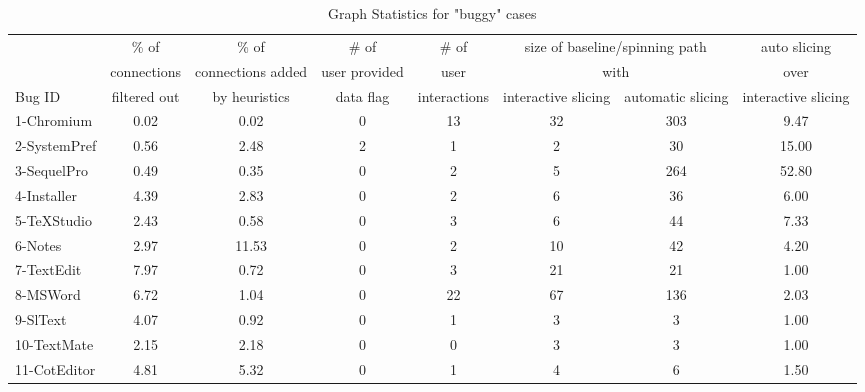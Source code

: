 \begin{table*}[ht]
\footnotesize
\centering
  \begin{tabularx}{\textwidth}{l|ccccccc}
 	   & \% of & \% of & \# of& \# of & \multicolumn{2}{c}{size of baseline/spinning path}& auto slicing\\
       & connections & connections added  & user provided & user  & \multicolumn{2}{c}{with}  & over \\
Bug ID & filtered out & by heuristics & data flag & interactions & interactive slicing & automatic slicing &  interactive slicing\\
\hline
\hline
1-Chromium & 0.02 & 0.02 & 0 & 13 & 32 & 303 & 9.47\\
2-SystemPref & 0.56 & 2.48 & 2 & 1 & 2 & 30 & 15.00\\
3-SequelPro & 0.49 & 0.35 & 0 & 2 & 5 & 264 & 52.80\\
4-Installer & 4.39 & 2.83 & 0 & 2 & 6 & 36  & 6.00\\
5-TeXStudio & 2.43 & 0.58 & 0 & 3 & 6 & 44  & 7.33\\
6-Notes & 2.97 & 11.53 & 0 & 2 & 10 & 42 & 4.20\\
7-TextEdit & 7.97 & 0.72 & 0 & 3 & 21 & 21 & 1.00\\
8-MSWord & 6.72 & 1.04 & 0 & 22 & 67 & 136 & 2.03\\
9-SlText & 4.07 & 0.92 & 0 & 1 & 3 & 3 & 1.00\\
10-TextMate & 2.15 & 2.18 & 0 & 0 & 3 & 3 & 1.00\\
11-CotEditor & 4.81 & 5.32 & 0 & 1 & 4 & 6 & 1.50\\
\hline
  \end{tabularx}
  \parbox{\textwidth}
  {\caption{Graph Statistics for "buggy" cases} 
    {
    }
  \label{table:results}
  }

\end{table*}


